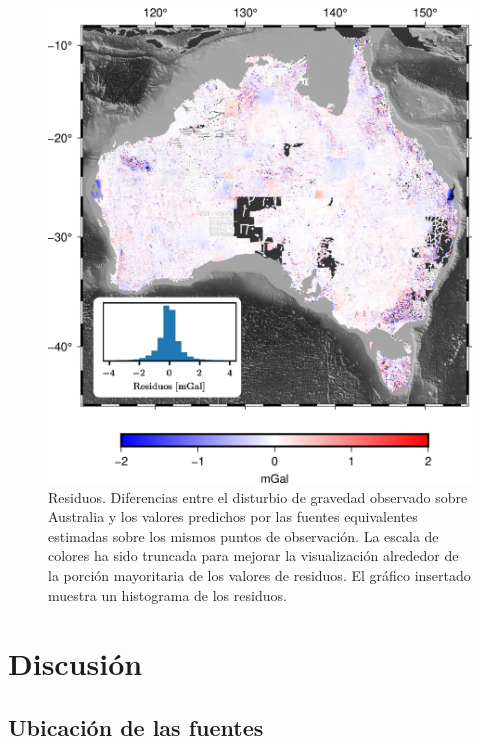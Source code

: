 \begin{figure}[t!]
    \centering
    \includegraphics[width=0.7\linewidth]{figs/eql-gradient-boosted/australia-residuals.png}
    \caption{
        Residuos.
        Diferencias entre el disturbio de gravedad observado sobre Australia
        y los valores predichos por las fuentes equivalentes estimadas sobre
        los mismos puntos de observación.
        La escala de colores ha sido truncada para mejorar la visualización
        alrededor de la porción mayoritaria de los valores de residuos.
        El gráfico insertado muestra un histograma de los residuos.
    }
    \label{fig:australia-residuals}
\end{figure}



\section{Discusión}

\subsection{Ubicación de las fuentes}

